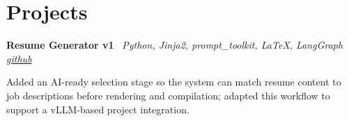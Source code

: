 \section{Projects}

    \hspace{0.5em} \textbf{Resume Generator v1} \textbar \  \textit{Python, Jinja2, prompt\_toolkit, LaTeX, LangGraph}
\hfill \textit{\href{https://github.com/knarfthekant}{github}}
    \vspace{0.10 cm}
    \begin{onecolentry}
        \begin{highlights}
            \item Added an AI-ready selection stage so the system can match resume content to job descriptions before rendering and compilation; adapted this workflow to support a vLLM-based project integration.
        \end{highlights}
    \end{onecolentry}
    \vspace{0.10 cm}

